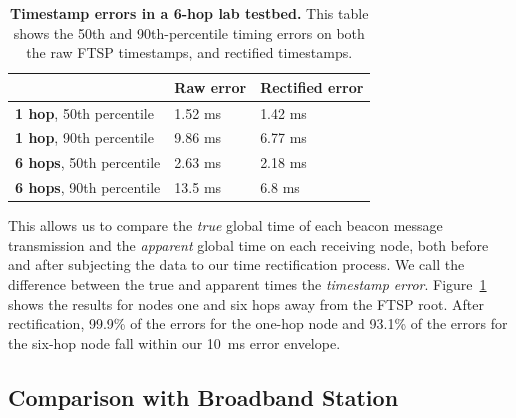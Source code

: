 \begin{table}[t]
\begin{center}
\begin{tabular}{|lll|} \hline & \textbf{Raw error} & \textbf{Rectified error} \\ \hline
\textbf{1 hop}, 50th percentile & 1.52 ms & 1.42 ms \\
\textbf{1 hop}, 90th percentile & 9.86 ms & 6.77 ms \\ \hline
\textbf{6 hops}, 50th percentile & 2.63 ms & 2.18 ms \\
\textbf{6 hops}, 90th percentile & 13.5 ms & 6.8 ms \\ \hline
\end{tabular}
\end{center}

\caption{\textbf{Timestamp errors in a 6-hop lab testbed.} This table shows
the 50th and 90th-percentile timing errors on both the raw FTSP timestamps,
and rectified timestamps.}

\label{evaluation-fig-time-rect-lab}
\end{table}

This allows us to compare the \textit{true} global time of each beacon
message transmission and the \textit{apparent} global time on each receiving
node, both before and after subjecting the data to our time rectification
process. We call the difference between the true and apparent times the
\textit{timestamp error}. Figure~\ref{evaluation-fig-time-rect-lab} shows the
results for nodes one and six hops away from the FTSP root. After
rectification, 99.9\% of the errors for the one-hop node and 93.1\% of the
errors for the six-hop node fall within our 10~ms error envelope.

\subsection{Comparison with Broadband Station}
\label{evaluation-sec-datagroundtruthing}

